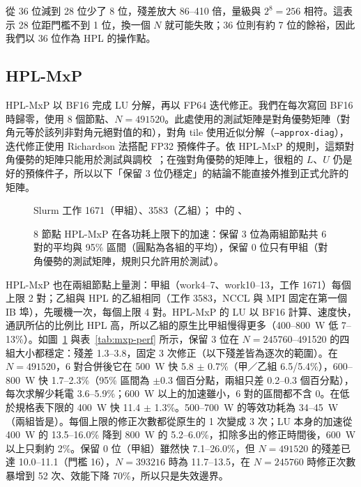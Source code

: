 從 36 位減到 28 位少了 8 位，殘差放大 86–410 倍，量級與 $2^{8} = 256$ 相符。這表示 28 位距門檻不到 1 位，換一個 $N$ 就可能失敗；36 位則有約 7 位的餘裕，因此我們以 36 位作為 HPL 的操作點。

\subsection{HPL-MxP}\label{sec:mxp}

HPL-MxP 以 BF16 完成 LU 分解，再以 FP64 迭代修正。我們在每次寫回 BF16 時歸零，使用 8 個節點、$N = 491520$。此處使用的測試矩陣是對角優勢矩陣（對角元等於該列非對角元絕對值的和），對角 tile 使用近似分解（\texttt{--approx-diag}），迭代修正使用 Richardson 法搭配 FP32 預條件子。依 HPL-MxP 的規則，這類對角優勢的矩陣只能用於測試與調校~\cite{HPLMxPRules}；在強對角優勢的矩陣上，很粗的 $L$、$U$ 仍是好的預條件子，所以以下「保留 3 位仍穩定」的結論不能直接外推到正式允許的矩陣。

\begin{figure}[tbp]
\centering
{}
\caption[8 節點 HPL-MxP 在各功耗上限下的加速]{8 節點 HPL-MxP 在各功耗上限下的加速：保留 3 位為兩組節點共 6 對的平均與 95\% 區間（圓點為各組的平均），保留 0 位只有甲組（對角優勢的測試矩陣，規則只允許用於測試）。}\label{fig:mxp}
\begin{figsource}Slurm 工作 1671（甲組）、3583（乙組）； 中的 、\end{figsource}
\end{figure}

HPL-MxP 也在兩組節點上量測：甲組（work4–7、work10–13，工作 1671）每個上限 2 對；乙組與 HPL 的乙組相同（工作 3583，NCCL 與 MPI 固定在第一個 IB 埠），先暖機一次，每個上限 4 對。HPL-MxP 的 LU 以 BF16 計算、速度快，通訊所佔的比例比 HPL 高，所以乙組的原生比甲組慢得更多（400–800~W 低 7–13\%）。如圖~\ref{fig:mxp} 與表~\ref{tab:mxp-perf} 所示，保留 3 位在 $N = 245760$–491520 的四組大小都穩定：殘差 1.3–3.8，固定 3 次修正（以下殘差皆為逐次的範圍）。在 $N = 491520$，6 對合併後它在 500~W 快 5.8 $\pm$ 0.7\%（甲／乙組 6.5/5.4\%），600–800~W 快 1.7–2.3\%（95\% 區間為 $\pm$0.3 個百分點，兩組只差 0.2–0.3 個百分點），每次求解少耗電 3.6–5.9\%；600~W 以上的加速雖小，6 對的區間都不含 0。在低於規格表下限的 400~W 快 11.4 $\pm$ 1.3\%。500–700~W 的等效功耗為 34–45~W（兩組皆是）。每個上限的修正次數都從原生的 1 次變成 3 次；LU 本身的加速從 400~W 的 13.5–16.0\% 降到 800~W 的 5.2–6.0\%，扣除多出的修正時間後，600~W 以上只剩約 2\%。保留 0 位（甲組）雖然快 7.1–26.0\%，但 $N = 491520$ 的殘差已達 10.0–11.1（門檻 16），$N = 393216$ 時為 11.7–13.5，在 $N = 245760$ 時修正次數暴增到 52 次、效能下降 70\%，所以只是失效邊界。

